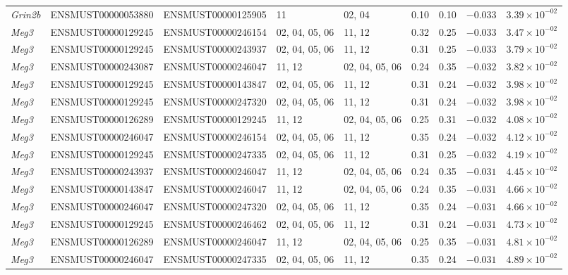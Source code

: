 \begin{landscape}
\begin{longtable}{@{} l l l p{2.8cm} p{2.8cm} r r r r @{}}
\textit{Grin2b} & ENSMUST00000053880 & ENSMUST00000125905 & 11 & 02, 04 & 0.10 & 0.10 & $-0.033$ & $3.39 \times 10^{-02}$ \\
\textit{Meg3}   & ENSMUST00000129245 & ENSMUST00000246154 & 02, 04, 05, 06 & 11, 12 & 0.32 & 0.25 & $-0.033$ & $3.47 \times 10^{-02}$ \\
\textit{Meg3}   & ENSMUST00000129245 & ENSMUST00000243937 & 02, 04, 05, 06 & 11, 12 & 0.31 & 0.25 & $-0.033$ & $3.79 \times 10^{-02}$ \\
\textit{Meg3}   & ENSMUST00000243087 & ENSMUST00000246047 & 11, 12 & 02, 04, 05, 06 & 0.24 & 0.35 & $-0.032$ & $3.82 \times 10^{-02}$ \\
\textit{Meg3}   & ENSMUST00000129245 & ENSMUST00000143847 & 02, 04, 05, 06 & 11, 12 & 0.31 & 0.24 & $-0.032$ & $3.98 \times 10^{-02}$ \\
\textit{Meg3}   & ENSMUST00000129245 & ENSMUST00000247320 & 02, 04, 05, 06 & 11, 12 & 0.31 & 0.24 & $-0.032$ & $3.98 \times 10^{-02}$ \\
\textit{Meg3}   & ENSMUST00000126289 & ENSMUST00000129245 & 11, 12 & 02, 04, 05, 06 & 0.25 & 0.31 & $-0.032$ & $4.08 \times 10^{-02}$ \\
\textit{Meg3}   & ENSMUST00000246047 & ENSMUST00000246154 & 02, 04, 05, 06 & 11, 12 & 0.35 & 0.24 & $-0.032$ & $4.12 \times 10^{-02}$ \\
\textit{Meg3}   & ENSMUST00000129245 & ENSMUST00000247335 & 02, 04, 05, 06 & 11, 12 & 0.31 & 0.25 & $-0.032$ & $4.19 \times 10^{-02}$ \\
\textit{Meg3}   & ENSMUST00000243937 & ENSMUST00000246047 & 11, 12 & 02, 04, 05, 06 & 0.24 & 0.35 & $-0.031$ & $4.45 \times 10^{-02}$ \\
\textit{Meg3}   & ENSMUST00000143847 & ENSMUST00000246047 & 11, 12 & 02, 04, 05, 06 & 0.24 & 0.35 & $-0.031$ & $4.66 \times 10^{-02}$ \\
\textit{Meg3}   & ENSMUST00000246047 & ENSMUST00000247320 & 02, 04, 05, 06 & 11, 12 & 0.35 & 0.24 & $-0.031$ & $4.66 \times 10^{-02}$ \\
\textit{Meg3}   & ENSMUST00000129245 & ENSMUST00000246462 & 02, 04, 05, 06 & 11, 12 & 0.31 & 0.24 & $-0.031$ & $4.73 \times 10^{-02}$ \\
\textit{Meg3}   & ENSMUST00000126289 & ENSMUST00000246047 & 11, 12 & 02, 04, 05, 06 & 0.25 & 0.35 & $-0.031$ & $4.81 \times 10^{-02}$ \\
\textit{Meg3}   & ENSMUST00000246047 & ENSMUST00000247335 & 02, 04, 05, 06 & 11, 12 & 0.35 & 0.24 & $-0.031$ & $4.89 \times 10^{-02}$ \\
\end{longtable}
\endgroup
\end{landscape}


